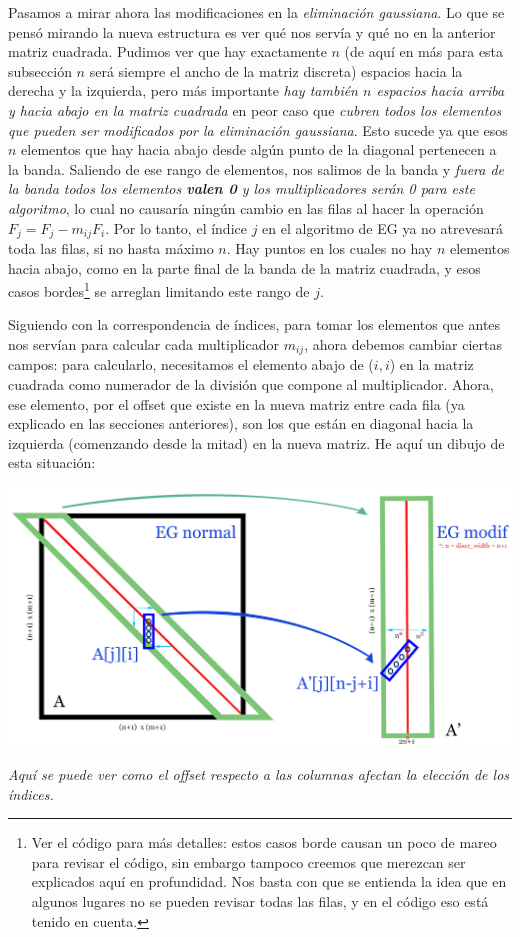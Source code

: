 Pasamos a mirar ahora las modificaciones en la \textit{eliminación gaussiana}. Lo que se pensó mirando la nueva estructura es ver qué nos servía y qué no en la anterior matriz cuadrada. Pudimos ver que hay exactamente $n$ (de aquí en más para esta subsección $n$ será siempre el ancho de la matriz discreta) espacios hacia la derecha y la izquierda, pero más importante \textit{hay también $n$ espacios hacia arriba y hacia abajo en la matriz cuadrada} en peor caso que \textit{cubren todos los elementos que pueden ser modificados por la eliminación gaussiana}. Esto sucede ya que esos $n$ elementos que hay hacia abajo desde algún punto de la diagonal pertenecen a la banda. Saliendo de ese rango de elementos, nos salimos de la banda y \textit{fuera de la banda todos los elementos \textbf{valen 0} y los multiplicadores serán 0 para este algoritmo}, lo cual no causaría ningún cambio en las filas al hacer la operación $F_j = F_j - m_{ij}F_i$. Por lo tanto, el índice $j$ en el algoritmo de EG ya no atrevesará toda las filas, si no hasta máximo $n$. Hay puntos en los cuales no hay $n$ elementos hacia abajo, como en la parte final de la banda de la matriz cuadrada, y esos casos bordes\footnote{Ver el código para más detalles: estos casos borde causan un poco de mareo para revisar el código, sin embargo tampoco creemos que merezcan ser explicados aquí en profundidad. Nos basta con que se entienda la idea que en algunos lugares no se pueden revisar todas las filas, y en el código eso está tenido en cuenta.} se arreglan limitando este rango de $j$.

Siguiendo con la correspondencia de índices, para tomar los elementos que antes nos servían para calcular cada multiplicador $m_{ij}$, ahora debemos cambiar ciertas campos: para calcularlo, necesitamos el elemento abajo de ($i,i$) en la matriz cuadrada como numerador de la división que compone al multiplicador. Ahora, ese elemento, por el offset que existe en la nueva matriz entre cada fila (ya explicado en las secciones anteriores), son los que están en diagonal hacia la izquierda (comenzando desde la mitad) en la nueva matriz. He aquí un dibujo de esta situación:

	\begin{center}
		\includegraphics[scale=1]{./img/matriz_A_eg_change1.png}
		\vspace{2pt}
		\par
		\footnotesize\textit{Aquí se puede ver como el offset respecto a las columnas afectan la elección de los índices.}
	\end{center}
	

